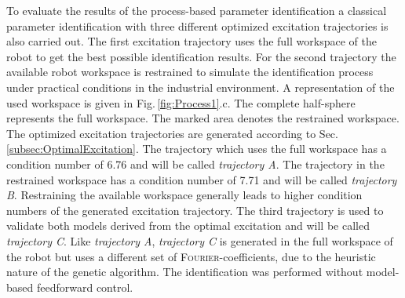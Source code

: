 
To evaluate the results of the process-based parameter identification a classical parameter identification with three different optimized excitation trajectories is also carried out. The first excitation trajectory uses the full workspace of the robot to get the best possible identification results. For the second trajectory the available robot workspace is restrained to simulate the identification process under practical conditions in the industrial environment. A representation of the used workspace is given in Fig.\,\ref{fig:Process1}.c. The complete half-sphere represents the full workspace. The marked area denotes the restrained workspace. The optimized excitation trajectories are generated according to Sec.\,\ref{subsec:OptimalExcitation}. The trajectory which uses the full workspace has a condition number of 6.76 and will be called \textit{trajectory A}. The trajectory in the restrained workspace has a condition number of 7.71 and will be called \textit{trajectory B}. Restraining the available workspace generally leads to higher condition numbers of the generated excitation trajectory. The third trajectory is used to validate both models derived from the optimal excitation and will be called \textit{trajectory C}. Like \textit{trajectory A}, \textit{trajectory C} is generated in the full workspace of the robot but uses a different set of \textsc{Fourier}-coefficients, due to the heuristic nature of the genetic algorithm. The identification was performed without model-based feedforward control.



